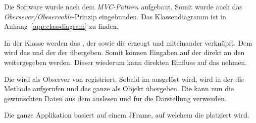 Die Software wurde nach dem \emph{MVC-Pattern} aufgebaut. Somit wurde auch das
\emph{Obersever/Obeservable}-Prinzip  eingebunden. Das Klassendiagramm  ist in
Anhang~\ref{app:classdiagram} zu finden.

In   der    Klasse       werden   das    ,   der
   sowie   die      erzeugt   und   miteinander
verkn\"upft. Dem      wird   das     und   der
  der    \"ubergeben. Somit  k\"onnen  Eingaben
auf  der     direkt   an  den     weitergegeben
werden. Dieser wiederum kann direkten Einfluss auf das  nehmen.

Die    wird  als   Observer  von    registriert. Sobald
im      ausgel\"ost   wird,  wird  in  der
 die Methode   aufgerufen und das ganze 
als Objekt \"ubergeben. Die   kann nun die  gew\"unschten Daten aus
dem  auslesen und f\"ur die Darstellung verwenden.

Die ganze  Applikation basiert auf  einem JFrame, auf welchem  die 
platziert wird.
